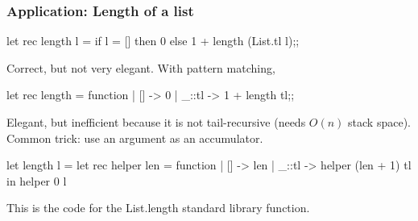 \documentclass{plt}
\begin{document}
\begin{frame}[fragile]
  \frametitle{Application: Length of a list}

\begin{ocaml}
let rec length l =
  if l = [] then 0 else 1 + length (List.tl l);;
\end{ocaml}

Correct, but not very elegant.  With pattern matching,

\begin{ocaml}
let rec length = function
 |  []    -> 0
 | _::tl -> 1 + length tl;;
\end{ocaml}

Elegant, but inefficient because it is not tail-recursive (needs
$O(n)$ stack space).  Common trick: use an argument as an accumulator.

\begin{ocaml}
let length l =
  let rec helper len = function
    |  []    -> len
    | _::tl -> helper (len + 1) tl
  in helper 0 l
\end{ocaml}

This is the code for the List.length standard library function.

\end{frame}
\end{document}
